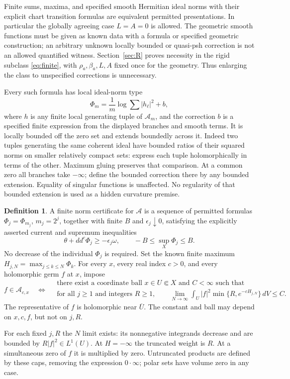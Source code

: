 \documentclass[11pt]{article}
\newcommand{\A}{\mathcal A}
\theoremstyle{definition}
\newtheorem{definition}[theorem]{Definition}
\begin{document}
Finite sums, maxima, and specified smooth Hermitian ideal norms with
their explicit chart transition formulas are equivalent permitted
presentations. In particular the globally agreeing case $L=A=0$
is allowed. The geometric smooth functions must be given as known
data with a formula or specified geometric construction; an
arbitrary unknown locally bounded or quasi-psh correction is not
an allowed quantified witness. Section~\ref{sec:R} proves necessity
in the rigid subclass \eqref{eq:finite}, with $\rho_a,\beta_a,L,A$
fixed once for the geometry. Thus enlarging the class to unspecified
corrections is unnecessary.

Every such formula has local ideal-norm type
\[
 \Phi_m=\frac1m\log\sum|h_\ell|^2+b,
\]
where $h$ is any finite local generating tuple of $\A_m$, and the
correction $b$ is a specified finite expression from the displayed
branches and smooth terms. It is locally bounded off the zero set
and extends boundedly across it. Indeed two tuples generating the
same coherent ideal have bounded ratios of their squared norms on
smaller relatively compact sets: express each tuple holomorphically
in terms of the other. Maximum gluing preserves that comparison.
At a common zero all branches take $-\infty$; define the bounded
correction there by any bounded extension. Equality of singular
functions is unaffected. No regularity of that bounded extension
is used as a hidden curvature premise.

\begin{definition}\label{def:cert}
A finite norm certificate for $\A$ is a sequence of permitted
formulas $\Phi_j=\Phi_{m_j}$, $m_j=2^j$, together with finite $B$
and $\epsilon_j\downarrow0$, satisfying the explicitly asserted
current and supremum inequalities
\begin{equation}\label{eq:curv}
 \theta+dd^c\Phi_j\geq-\epsilon_j\omega,
 \qquad -B\leq\sup_X\Phi_j\leq B.
\end{equation}
No decrease of the individual $\Phi_j$ is required. Set the known
finite maximum $H_{j,N}=\max_{j\leq k\leq N}\Phi_k$.
For every $x$, every real index $c>0$, and every holomorphic germ
$f$ at $x$, impose
\begin{equation}\label{eq:test}
 f\in\A_{c,x}\quad\Longleftrightarrow\quad
 \begin{gathered}
 \text{there exist a coordinate ball }x\in U\Subset X
 \text{ and }C<\infty\text{ such that}\\
 \text{for all }j\geq1\text{ and integers }R\geq1,\qquad
 \lim_{N\to\infty}\int_U|f|^2
       \min\{R,e^{-cH_{j,N}}\}\,dV\leq C.
 \end{gathered}
\end{equation}
The representative of $f$ is holomorphic near $\overline U$.
The constant and ball may depend on $x,c,f$, but not on $j,R$.
\end{definition}
For each fixed $j,R$ the $N$ limit exists: its nonnegative
integrands decrease and are bounded by $R|f|^2\in L^1(U)$.
At $H=-\infty$ the truncated weight is $R$. At a simultaneous zero
of $f$ it is multiplied by zero. Untruncated products are defined
by these caps, removing the expression $0\cdot\infty$; polar
sets have volume zero in any case.
\end{document}
